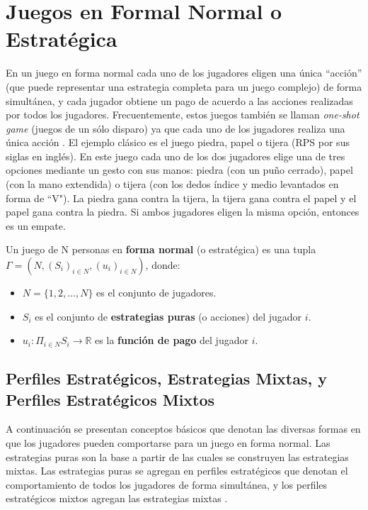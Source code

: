 \chapter{Juegos en Formal Normal o Estratégica}
\label{chapter:forma-normal}

En un juego en forma normal cada uno de los jugadores eligen una única ``acción'' (que puede representar una estrategia completa para un juego complejo) de forma simultánea, y cada jugador obtiene un pago de acuerdo a las acciones realizadas por todos los jugadores. Frecuentemente, estos juegos también se llaman \textit{one-shot game} (juegos de un sólo disparo) ya que cada uno de los jugadores realiza una única acción \cite{bib:introductionCFR}. El ejemplo clásico es el juego piedra, papel o tijera (RPS por sus siglas en inglés). En este juego cada uno de los dos jugadores elige una de tres opciones mediante un gesto con sus manos: piedra (con un puño cerrado), papel (con la mano extendida) o tijera (con los dedos índice y medio levantados en forma de ``V"). La piedra gana contra la tijera, la tijera gana contra el papel y el papel gana contra la piedra. Si ambos jugadores eligen la misma opción, entonces es un empate.

\begin{definition}
\label{def:forma-normal}
Un juego de N personas en \textbf{forma normal} (o estratégica) es una tupla $\Gamma = (N, (S_i)_{i \in N}, (u_i)_{i \in N})$, donde:
	\begin{itemize}[]
		\item $N = \{1, 2, \dots, N\}$ es el conjunto de jugadores.
		\item  $S_i$ es el conjunto de \textbf{estrategias puras} (o acciones) del jugador $i$.
		\item $u_i : \Pi _{i \in N} S_i \rightarrow \mathbb{R}$ es la \textbf{función de pago} del jugador $i$.
	\end{itemize}
\end{definition}

\section{Perfiles Estratégicos, Estrategias Mixtas, y Perfiles Estratégicos Mixtos}
A continuación se presentan conceptos básicos que denotan las diversas formas en que los jugadores pueden comportarse para un juego en forma normal. Las estrategias puras son la base a partir de las cuales se construyen las estrategias mixtas. Las estrategias puras se agregan en perfiles estratégicos que denotan el comportamiento de todos los jugadores de forma simultánea, y los perfiles estratégicos mixtos agregan las estrategias mixtas \cite{bib:tutorial-existence-nash}.


